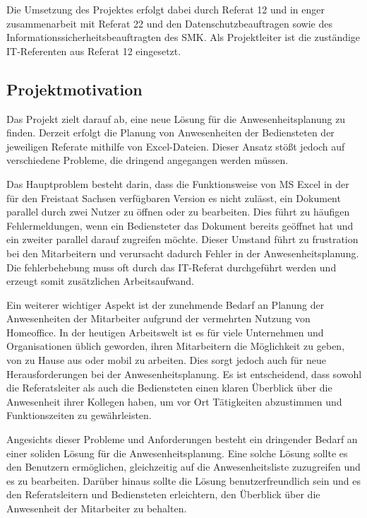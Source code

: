 Die Umsetzung des Projektes erfolgt dabei durch Referat 12 und in enger zusammenarbeit mit Referat 22 und den Datenschutzbeauftragen sowie des Informationssicherheitsbeauftragten des SMK. Als Projektleiter ist die zuständige IT-Referenten aus Referat 12 eingesetzt.

\subsection{Projektmotivation}
\label{sec:Projektmotivation}
Das Projekt zielt darauf ab, eine neue Lösung für die Anwesenheitsplanung zu finden. Derzeit erfolgt die Planung von Anwesenheiten der Bediensteten der jeweiligen Referate mithilfe von Excel-Dateien. Dieser Ansatz stößt jedoch auf verschiedene Probleme, die dringend angegangen werden müssen.

Das Hauptproblem besteht darin, dass die Funktionsweise von MS Excel in der für den Freistaat Sachsen verfügbaren Version es nicht zulässt, ein Dokument parallel durch zwei Nutzer zu öffnen oder zu bearbeiten. Dies führt zu häufigen Fehlermeldungen, wenn ein Bediensteter das Dokument bereits geöffnet hat und ein zweiter parallel darauf zugreifen möchte. Dieser Umstand führt zu frustration bei den Mitarbeitern und verursacht dadurch Fehler in der Anwesenheitsplanung. Die fehlerbehebung muss oft durch das IT-Referat durchgeführt werden und erzeugt somit zusätzlichen Arbeitsaufwand.

Ein weiterer wichtiger Aspekt ist der zunehmende Bedarf an Planung der Anwesenheiten der Mitarbeiter aufgrund der vermehrten Nutzung von Homeoffice. In der heutigen Arbeitswelt ist es für viele Unternehmen und Organisationen üblich geworden, ihren Mitarbeitern die Möglichkeit zu geben, von zu Hause aus oder mobil zu arbeiten. Dies sorgt jedoch auch für neue Herausforderungen bei der Anwesenheitsplanung. Es ist entscheidend, dass sowohl die Referatsleiter als auch die Bediensteten einen klaren Überblick über die Anwesenheit ihrer Kollegen haben, um vor Ort Tätigkeiten abzustimmen und \zB Funktionszeiten zu gewährleisten.

Angesichts dieser Probleme und Anforderungen besteht ein dringender Bedarf an einer soliden Lösung für die Anwesenheitsplanung. Eine solche Lösung sollte es den Benutzern ermöglichen, gleichzeitig auf die Anwesenheitsliste zuzugreifen und es zu bearbeiten. Darüber hinaus sollte die Lösung benutzerfreundlich sein und es den Referatsleitern und Bediensteten erleichtern, den Überblick über die Anwesenheit der Mitarbeiter zu behalten.


